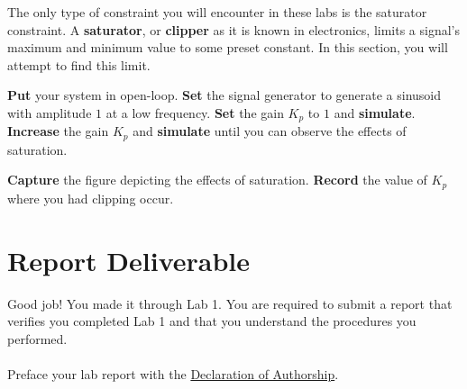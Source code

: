 The only type of constraint you will encounter in these labs is the saturator
constraint. A \textbf{saturator}, or \textbf{clipper} as it is known in
electronics, limits a signal's maximum and minimum value to some preset
constant. In this section, you will attempt to find this limit.
%
\begin{procedure}[label={proc:lab1:p6}]
  \textbf{Put} your system in open-loop. \textbf{Set} the signal generator to
  generate a sinusoid with amplitude \(1\) at a low frequency.
  \textbf{Set} the gain \(K_p\) to \(1\) and \textbf{simulate}.
  \textbf{Increase} the gain \(K_p\) and \textbf{simulate} until you can
  observe the effects of saturation.
\end{procedure}
%
\begin{deliverable}[label={lab1:d6}]
  \textbf{Capture} the figure depicting the effects of saturation.
  \textbf{Record} the value of \(K_p\) where you had clipping occur.
\end{deliverable}

\section{Report Deliverable}
Good job! You made it through Lab 1. You are required to submit a report
that verifies you completed Lab 1 and that you understand the procedures you
performed. \\
\\
Preface your lab report with the \hyperlink{intro:decl}{Declaration of Authorship}.\\


